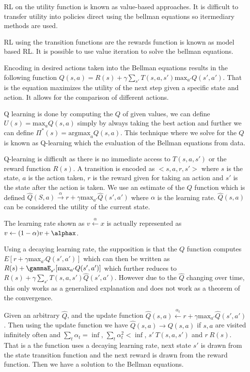 \documentclass{article}
\begin{document}
RL  on the utility function is known as value-based approaches. It is
difficult to transfer utility into policies direct using the bellman
equations so itermediary methods are used.

RL using the transition functions are the rewards function is known as model
based RL. It is possible to use value iteration to solve the bellman equations.


Encoding in desired actions taken into the Bellman equations results in the
following function $Q(s,a) = R(s) + \gamma\sum_{s'}T(s,a,s')\text{max}_{a'}Q(s',
a')$. That is the equation maximizes the utility of the next step given a
specific state and action. It allows for the comparison of different actions.

Q learning is done by computing the $Q$ of given values, we can define $U(s) =
\text{max}_aQ(s,a)$ simply by always taking the best action and further we can
define $\Pi^*(s) = \text{argmax}_aQ(s,a)$. This technique where we solve for the
$Q$ is known as Q-learning which the evaluation of the Bellman equations from
data.

Q-learning is difficult as there is no immediate access to $T(s,a,s')$ or the 
reward function $R(s)$.  A transition is encoded as $<s,a,r,s'>$ where $s$ is 
the state, $a$ is the action taken, $r$ is the reward given for taking an action
and $s'$ is the state after the action is taken. We use an estimate of the 
$Q$ function which is defined $\hat{Q}(S,a) \xrightarrow{\alpha} r + 
\gamma\text{max}_{a'}\hat{Q}(s',a')$ where $\alpha$ is the learning rate. 
$\hat{Q}(s,a)$ can be considered the utility of the current state.

The learning rate shown as $v \xleftarrow{\alpha} x$ is actually represented as
$v \leftarrow (1 - \alpha)v + \alphax$.

Using a decaying learning rate, the supposition is that the $Q$ function
computes $E[r + \gamma\text{max}_{a'}Q(s',a')]$ which can then be written as
$R(s) + \gammaE_{s'}[\text{max}_{a'}Q(s',a')]$ which further reduces to $R(s) +
\gamma\sum_{s'}T(s,a,s')\hat{Q}(s',a')$. However due to the $\hat{Q}$ changing
over time, this only works as a generalized explanation and does not work as
a theorem of the convergence.

Given an arbitrary $\hat{Q}$, and the update function $\hat{Q}(s,a) \xleftarrow{
\alpha_t} r + \gamma\text{max}_{a'}\hat{Q}(s',a')$. Then using the update
function we have $\hat{Q}(s,a) \rightarrow Q(s,a)$ if $s,a$ are visited
infinitely often and $\sum_t \alpha_t = \inf$, $\sum_t \alpha_t^2 < \inf$, $s'
~ T(s,a,s')$ and $r ~ R(s)$. That is a the function uses a decaying learning
rate, next state $s'$ is drawn from the state transition function and the next
reward is drawn from the reward function. Then we have a solution to the
Bellman equations.
\end{document}
